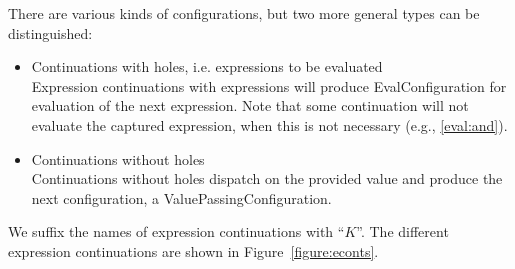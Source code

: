 \documentclass[a4paper,oneside]{article}
\begin{document}
There are various kinds of configurations, but two more general types can be distinguished:

\begin{itemize}
    \item Continuations with holes, i.e. expressions to be evaluated\\
        Expression continuations with expressions will produce EvalConfiguration for evaluation of the next expression.
        Note that some continuation will not evaluate the captured expression, when this is not necessary (e.g., \eqref{eval:and}).

    \item Continuations without holes\\
        Continuations without holes dispatch on the provided value and produce the next configuration, a ValuePassingConfiguration.

\end{itemize}

We suffix the names of expression continuations with ``$K$''.
The different expression continuations are shown in Figure~\ref{figure:econts}.

\newcommand{\ExceptionHandlersRest}{\handler,\,\cstrace,\,\cex}
\newcommand{\ExceptionHandlers}{\strace,\,\handler,\,\cstrace,\,\cex}
\newcommand{\VarSetK}[3]{\mathrm{VarSetK}({#1},\,{#2},\,{#3})}
\newcommand{\ExpressionsK}[3]{\mathrm{ExpressionsK}({#1},\,{#2},\,\ExceptionHandlers,\,{#3})}

\newcommand{\NotK}[1]{\mathrm{NotK}({#1})}
\newcommand{\AndK}[3]{\mathrm{AndK}({#1},\,{#2},\,\ExceptionHandlers,\,{#3})}
\newcommand{\OrK}[3]{\mathrm{OrK}({#1},\,{#2},\,\ExceptionHandlers,\,{#3})}
\newcommand{\ConditionalK}[4]{\mathrm{ConditionalK}({#1},\,{#2},\,{#3},\,\ExceptionHandlers,\,{#4})}

\newcommand{\LetK}[4]{\mathrm{LetK}({#1},\,{#2},\,{#3},\,\ExceptionHandlers,\,{#4})}

\newcommand{\IsExpressionK}{\mathrm{IsExpressionK}(\tt{T},\,\econt)}
\newcommand{\AsExpressionK}{\mathrm{AsExpressionK}(\tt{T},\,\strace,\,\handler,\,\econt)}

\newcommand{\StaticGetK}{\mathrm{StaticGetK}(\membermeta,\,\econt)}
\newcommand{\StaticSetK}{\mathrm{StaticSetK}(\membermeta,\,\econt)}
\newcommand{\PropertyGetK}{\mathrm{PropertyGetK}(\idmeta,\,\ExceptionHandlers,\,\econt)}
\newcommand{\PropertySetK}{\mathrm{PropertySetK}(\idmeta,\,\expressionmeta_1,\,\env,\,\ExceptionHandlers,\,\econt)}
\newcommand{\PropertySetVK}{\mathrm{PropertySetValueK}(\val_0,\,\idmeta,\,\ExceptionHandlers,\,\econt)}
\newcommand{\DPropertyGetK}{\mathrm{DPropertyGetK}(\membermeta,\,\ExceptionHandlers,\,\econt)}
\newcommand{\DirectPropertySetK}{\mathrm{DPropertySetK}(\membermeta,\,\expressionmeta_1,\,\env,\,\ExceptionHandlers,\,\econt)}
\newcommand{\DPropertySetVK}{\mathrm{DPropertySetValueK}(\val_0,\,\membermeta,\,\ExceptionHandlers,\,\econt)}
\newcommand{\SuperPropertySetK}{\mathrm{SuperPropertySetK}(\idmeta,\,\env,\,\ExceptionHandlers,\,\econt)}
\end{document}
